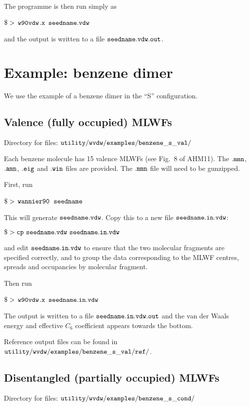 \documentclass{report}
\newcommand{\wvdw}{{$\tt{w90vdw}$}}
\newcommand{\wannier}{{$\tt{wannier90}$}}
\begin{document}
The programme is then run simply as

$\tt{\$>}$ \wvdw$\tt{.x}$ $\tt{seedname.vdw}$

and the output is written to a file $\tt{seedname.vdw.out}$.

\section{Example: benzene dimer}

We use the example of a benzene dimer in the ``S''
configuration.

\subsection{Valence (fully occupied) MLWFs}

Directory for files: $\tt{utility/wvdw/examples/benzene\_s\_val/}$

Each benzene molecule has 15 valence MLWFs (see Fig.~8 of AHM11).  The
$\tt{.mmn}$, $\tt{.amn}$, $\tt{.eig}$ and $\tt{.win}$ files are
provided. The $\tt{.mmn}$ file will need to be gunzipped.

First, run

$\tt{\$>}$ \wannier\ $\tt{seedname}$

This will generate $\tt{seedname.vdw}$. Copy this to a new file
$\tt{seedname.in.vdw}$:

$\tt{\$> cp\ seedname.vdw\ seedname.in.vdw}$

and edit $\tt{seedname.in.vdw}$ to ensure that the two molecular
fragments are specified correctly, and to group the data corresponding
to the MLWF centres, spreads and occupancies by molecular fragment.

Then run

$\tt{\$>}$ \wvdw$\tt{.x}$ $\tt{seedname.in.vdw}$

The output is written to a file $\tt{seedname.in.vdw.out}$ and the van der Waals
energy and effective $C_6$ coefficient appears towards the bottom.

Reference output files can be found in  $\tt{utility/wvdw/examples/benzene\_s\_val/ref/}$.

\subsection{Disentangled (partially occupied) MLWFs}

Directory for files: $\tt{utility/wvdw/examples/benzene\_s\_cond/}$
\end{document}
